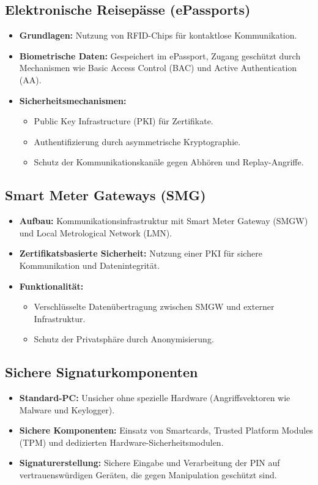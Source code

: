 \documentclass{article}
\begin{document}
\subsection{Elektronische Reisepässe (ePassports)}
\begin{itemize}
    \item \textbf{Grundlagen:} Nutzung von RFID-Chips für kontaktlose Kommunikation.
    \item \textbf{Biometrische Daten:} Gespeichert im ePassport, Zugang geschützt durch Mechanismen wie Basic Access Control (BAC) und Active Authentication (AA).
    \item \textbf{Sicherheitsmechanismen:}
    \begin{itemize}
        \item Public Key Infrastructure (PKI) für Zertifikate.
        \item Authentifizierung durch asymmetrische Kryptographie.
        \item Schutz der Kommunikationskanäle gegen Abhören und Replay-Angriffe.
    \end{itemize}
\end{itemize}

\subsection{Smart Meter Gateways (SMG)}
\begin{itemize}
    \item \textbf{Aufbau:} Kommunikationsinfrastruktur mit Smart Meter Gateway (SMGW) und Local Metrological Network (LMN).
    \item \textbf{Zertifikatsbasierte Sicherheit:} Nutzung einer PKI für sichere Kommunikation und Datenintegrität.
    \item \textbf{Funktionalität:}
    \begin{itemize}
        \item Verschlüsselte Datenübertragung zwischen SMGW und externer Infrastruktur.
        \item Schutz der Privatsphäre durch Anonymisierung.
    \end{itemize}
\end{itemize}

\subsection{Sichere Signaturkomponenten}
\begin{itemize}
    \item \textbf{Standard-PC:} Unsicher ohne spezielle Hardware (Angriffsvektoren wie Malware und Keylogger).
    \item \textbf{Sichere Komponenten:} Einsatz von Smartcards, Trusted Platform Modules (TPM) und dedizierten Hardware-Sicherheitsmodulen.
    \item \textbf{Signaturerstellung:} Sichere Eingabe und Verarbeitung der PIN auf vertrauenswürdigen Geräten, die gegen Manipulation geschützt sind.
\end{itemize}
\end{document}
